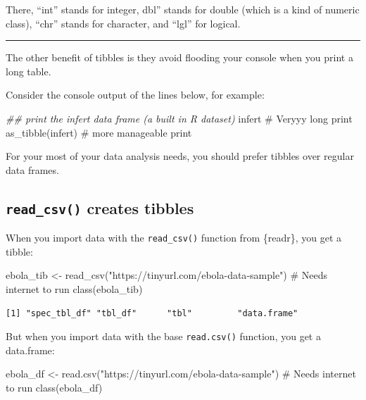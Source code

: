 \documentclass[
  letterpaper,
  DIV=11,
  numbers=noendperiod]{scrreprt}
\newenvironment{Shaded}{\begin{snugshade}}{\end{snugshade}}
\newcommand{\CommentTok}[1]{\textcolor[rgb]{0.37,0.37,0.37}{#1}}
\newcommand{\DocumentationTok}[1]{\textcolor[rgb]{0.37,0.37,0.37}{\textit{#1}}}
\newcommand{\FunctionTok}[1]{\textcolor[rgb]{0.28,0.35,0.67}{#1}}
\newcommand{\NormalTok}[1]{\textcolor[rgb]{0.00,0.23,0.31}{#1}}
\newcommand{\OtherTok}[1]{\textcolor[rgb]{0.00,0.23,0.31}{#1}}
\newcommand{\StringTok}[1]{\textcolor[rgb]{0.13,0.47,0.30}{#1}}
\begin{document}
There, ``int'' stands for integer, dbl'' stands for double (which is a
kind of numeric class), ``chr'' stands for character, and ``lgl'' for
logical.

\begin{center}\rule{0.5\linewidth}{0.5pt}\end{center}

The other benefit of tibbles is they avoid flooding your console when
you print a long table.

Consider the console output of the lines below, for example:

\begin{Shaded}
\begin{Highlighting}[]
\DocumentationTok{\#\# print the infert data frame (a built in R dataset)}
\NormalTok{infert }\CommentTok{\# Veryyy long print}
\FunctionTok{as\_tibble}\NormalTok{(infert) }\CommentTok{\# more manageable print}
\end{Highlighting}
\end{Shaded}

For your most of your data analysis needs, you should prefer tibbles
over regular data frames.

\subsection{\texorpdfstring{\texttt{read\_csv()} creates
tibbles}{read\_csv() creates tibbles}}\label{read_csv-creates-tibbles}

When you import data with the \texttt{read\_csv()} function from
\{readr\}, you get a tibble:

\begin{Shaded}
\begin{Highlighting}[]
\NormalTok{ebola\_tib }\OtherTok{\textless{}{-}} \FunctionTok{read\_csv}\NormalTok{(}\StringTok{"https://tinyurl.com/ebola{-}data{-}sample"}\NormalTok{) }\CommentTok{\# Needs internet to run}
\FunctionTok{class}\NormalTok{(ebola\_tib)}
\end{Highlighting}
\end{Shaded}

\begin{verbatim}
[1] "spec_tbl_df" "tbl_df"      "tbl"         "data.frame" 
\end{verbatim}

But when you import data with the base \texttt{read.csv()} function, you
get a data.frame:

\begin{Shaded}
\begin{Highlighting}[]
\NormalTok{ebola\_df }\OtherTok{\textless{}{-}} \FunctionTok{read.csv}\NormalTok{(}\StringTok{"https://tinyurl.com/ebola{-}data{-}sample"}\NormalTok{) }\CommentTok{\# Needs internet to run}
\FunctionTok{class}\NormalTok{(ebola\_df)}
\end{Highlighting}
\end{Shaded}
\end{document}
